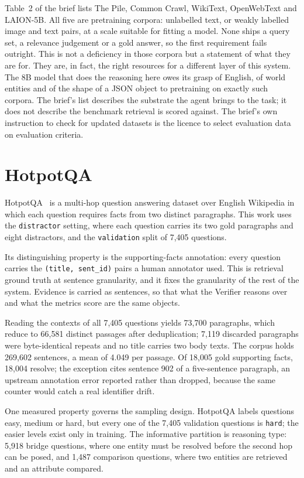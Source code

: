 Table~2 of the brief lists The Pile, Common Crawl, WikiText, OpenWebText and
LAION-5B. All five are pretraining corpora: unlabelled text, or weakly
labelled image and text pairs, at a scale suitable for fitting a model. None
ships a query set, a relevance judgement or a gold answer, so the first
requirement fails outright. This is not a deficiency in those corpora but a
statement of what they are for. They are, in fact, the right resources for a
different layer of this system. The 8B model that does the reasoning here owes
its grasp of English, of world entities and of the shape of a JSON object to
pretraining on exactly such corpora. The brief's list describes the substrate
the agent brings to the task; it does not describe the benchmark retrieval is
scored against. The brief's own instruction to check for updated datasets is
the licence to select evaluation data on evaluation criteria.

\section{HotpotQA}
\label{sec:hotpotqa}

HotpotQA~\cite{yang2018hotpotqa} is a multi-hop question answering dataset over
English Wikipedia in which each question requires facts from two distinct
paragraphs. This work uses the \texttt{distractor} setting, where each
question carries its two gold paragraphs and eight distractors, and the
\texttt{validation} split of 7{,}405 questions.

Its distinguishing property is the supporting-facts annotation: every question
carries the \texttt{(title, sent\_id)} pairs a human annotator used. This is
retrieval ground truth at sentence granularity, and it fixes the granularity of
the rest of the system. Evidence is carried as sentences, so that what the
Verifier reasons over and what the metrics score are the same objects.

Reading the contexts of all 7{,}405 questions yields 73{,}700 paragraphs, which
reduce to 66{,}581 distinct passages after deduplication; 7{,}119 discarded
paragraphs were byte-identical repeats and no title carries two body texts. The
corpus holds 269{,}602 sentences, a mean of 4.049 per passage. Of 18{,}005 gold
supporting facts, 18{,}004 resolve; the exception cites sentence 902 of a
five-sentence paragraph, an upstream annotation error reported rather than
dropped, because the same counter would catch a real identifier drift.

One measured property governs the sampling design. HotpotQA labels questions
easy, medium or hard, but every one of the 7{,}405 validation questions is
\texttt{hard}; the easier levels exist only in training. The informative
partition is reasoning type: 5{,}918 bridge questions, where one entity must be
resolved before the second hop can be posed, and 1{,}487 comparison questions,
where two entities are retrieved and an attribute compared.

